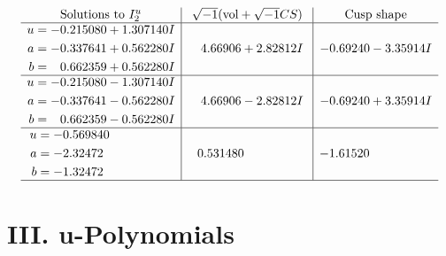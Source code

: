 \documentclass[1p]{elsarticle_modified}
\theoremstyle{definition}
\newcommand{\I}{\sqrt{-1}}
\begin{document}
$$\begin{array}{c|c|c}  
\text{Solutions to }I^u_{2}& \I (\text{vol} + \sqrt{-1}CS) & \text{Cusp shape}\\
 \hline 
\begin{aligned}
u &= -0.215080 + 1.307140 I \\
a &= -0.337641 + 0.562280 I \\
b &= \phantom{-}0.662359 + 0.562280 I\end{aligned}
 & \phantom{-}4.66906 + 2.82812 I & -0.69240 - 3.35914 I \\ \hline\begin{aligned}
u &= -0.215080 - 1.307140 I \\
a &= -0.337641 - 0.562280 I \\
b &= \phantom{-}0.662359 - 0.562280 I\end{aligned}
 & \phantom{-}4.66906 - 2.82812 I & -0.69240 + 3.35914 I \\ \hline\begin{aligned}
u &= -0.569840\phantom{ +0.000000I} \\
a &= -2.32472\phantom{ +0.000000I} \\
b &= -1.32472\phantom{ +0.000000I}\end{aligned}
 & \phantom{-}0.531480\phantom{ +0.000000I} & -1.61520\phantom{ +0.000000I}\\
 \hline 
 \end{array}$$\newpage
\newpage\renewcommand{\arraystretch}{1}
\centering \section*{ III. u-Polynomials}
\end{document}

